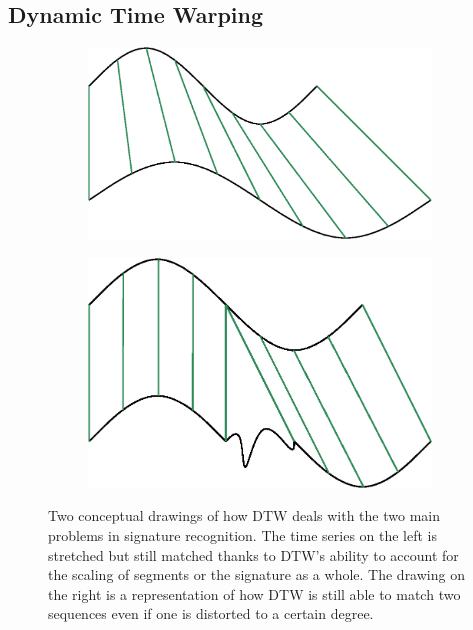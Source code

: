 \documentclass[a4paper, oneside]{csthesis}
\begin{document}
\subsection{Dynamic Time Warping}


\begin{figure}
        \centering
        \begin{subfigure}[b]{0.30\textwidth}
                \centering
                \includegraphics[width=\textwidth]{figures/dtw-stretch.eps}
                \label{fig:hmm1}
        \end{subfigure}%
        \quad
        \begin{subfigure}[b]{0.30\textwidth}
                \centering
                \includegraphics[width=\textwidth]{figures/dtw-distort.eps}
                \label{fig:hmm1}
        \end{subfigure}%

        \caption{Two conceptual drawings of how DTW deals with the two main problems in signature recognition. The time series on the left is stretched but still matched thanks to DTW's ability to account for the scaling of segments or the signature as a whole. The drawing on the right is a representation of how DTW is still able to match two sequences even if one is distorted to a certain degree.}
        \label{fig:dtw-model}
\end{figure}
\end{document}
